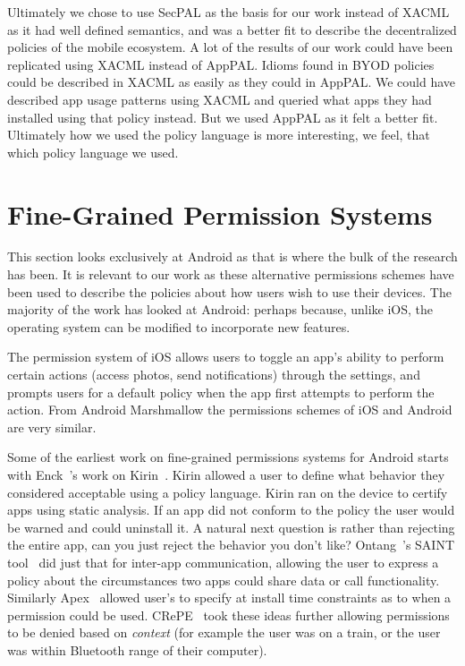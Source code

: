 \documentclass[thesis.tex]{subfiles}
\begin{document}
Ultimately we chose to use SecPAL as the basis for our work instead of XACML as
it had well defined semantics, and was a better fit to describe the
decentralized policies of the mobile ecosystem. A lot of the results of our work
could have been replicated using XACML instead of AppPAL. Idioms found in BYOD
policies could be described in XACML as easily as they could in AppPAL. We could
have described app usage patterns using XACML and queried what apps they had
installed using that policy instead. But we used AppPAL as it felt a better fit.
Ultimately how we used the policy language is more interesting, we feel, that
which policy language we used.

\section{Fine-Grained Permission Systems}
\label{sec:fine-grained-permissions}

This section looks exclusively at Android as that is where the bulk of the
research has been. It is relevant to our work as these alternative permissions
schemes have been used to describe the policies about how users wish to use
their devices. The majority of the work has looked at Android: perhaps because,
unlike iOS, the operating system can be modified to incorporate new features.

The permission system of iOS allows users to
toggle an app's ability to perform certain actions (access photos,
send notifications) through the settings, and prompts users for a
default policy when the app first attempts to perform the action.
From Android Marshmallow the permissions schemes of iOS and Android
are very similar.

Some of the earliest work on fine-grained permissions systems for
Android starts with Enck~\etal's work on
Kirin~\cite{enck_lightweight_2009}.  Kirin allowed a user to define
what behavior they considered acceptable using a policy language.
Kirin ran on the device to certify apps using static analysis.  If an
app did not conform to the policy the user would be warned and could
uninstall it.  A natural next question is rather than rejecting the
entire app, can you just reject the behavior you don't like?
Ontang~\etal's SAINT tool~\cite{ongtang_semantically_2012} did just
that for inter-app communication, allowing the user to express a
policy about the circumstances two apps could share data or call
functionality.  Similarly Apex~\cite{nauman_apex:_2010} allowed user's
to specify at install time constraints as to when a permission could
be used.  
CRePE~\cite{conti_crepe:_2010} took
these ideas further allowing permissions to be denied based on
\emph{context} (for example the user was on a train, or the user was
within Bluetooth range of their computer).
\end{document}
